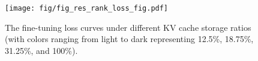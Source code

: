\begin{figure}[t]
  \centering
  \texttt{[image: fig/fig\_res\_rank\_loss\_fig.pdf]}
  \caption{The fine-tuning loss curves under different KV cache storage ratios (with colors ranging from light to dark representing 12.5\%, 18.75\%, 31.25\%, and 100\%).}
  \label{fig:res_rank_loss}
  \vspace{-0.3cm}
\end{figure}